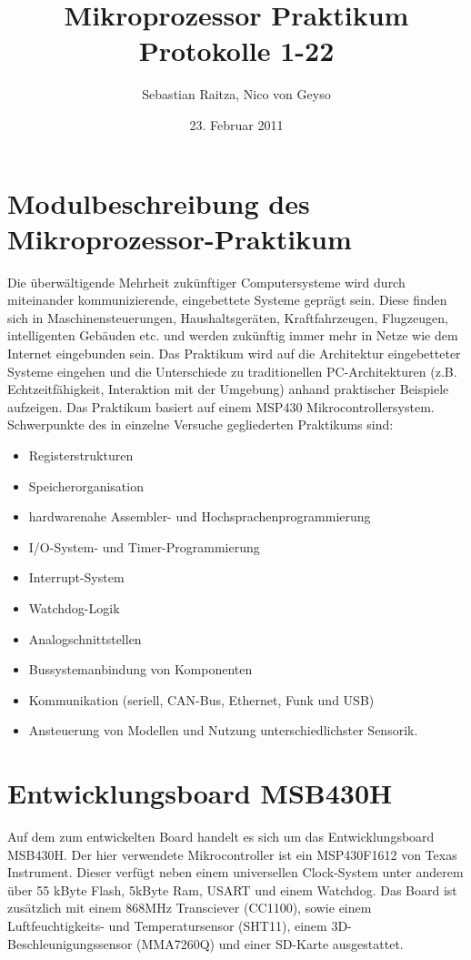 \documentclass[11pt,german]{scrartcl}
\title{Mikroprozessor Praktikum\\Protokolle 1-22}
\author{Sebastian Raitza, Nico von Geyso}
\date{23. Februar 2011}
\begin{document}
\maketitle

\tableofcontents

\section{Modulbeschreibung des Mikroprozessor-Praktikum}

Die überwältigende Mehrheit zukünftiger Computersysteme wird durch miteinander kommunizierende, eingebettete Systeme geprägt sein.
Diese finden sich in Maschinensteuerungen, Haushaltsgeräten, Kraftfahrzeugen, Flugzeugen, intelligenten Gebäuden etc. und
werden zukünftig immer mehr in Netze wie dem Internet eingebunden sein.
Das Praktikum wird auf die Architektur eingebetteter Systeme eingehen und die Unterschiede zu traditionellen PC-Architekturen
(z.B. Echtzeitfähigkeit, Interaktion mit der Umgebung) anhand praktischer Beispiele aufzeigen.
Das Praktikum basiert auf einem MSP430 Mikrocontrollersystem.
Schwerpunkte des in einzelne Versuche gegliederten Praktikums sind:
\begin{itemize}
    \item Registerstrukturen
    \item Speicherorganisation
    \item hardwarenahe Assembler- und Hochsprachenprogrammierung
    \item I/O-System- und Timer-Programmierung
    \item Interrupt-System
    \item Watchdog-Logik
    \item Analogschnittstellen
    \item Bussystemanbindung von Komponenten
    \item Kommunikation (seriell, CAN-Bus, Ethernet, Funk und USB)
    \item Ansteuerung von Modellen und Nutzung unterschiedlichster Sensorik.
\end{itemize}


\section{Entwicklungsboard MSB430H}
Auf dem zum entwickelten Board handelt es sich um das Entwicklungsboard MSB430H.
Der hier verwendete Mikrocontroller ist ein MSP430F1612 von Texas Instrument.
Dieser verfügt neben einem universellen Clock-System unter anderem über 55 kByte Flash, 5kByte Ram, USART und einem Watchdog.
Das Board ist zusätzlich mit einem 868MHz Transciever (CC1100),
sowie einem Luftfeuchtigkeits- und Temperatursensor (SHT11), einem 3D-Beschleunigungssensor (MMA7260Q)
und einer SD-Karte ausgestattet.
\end{document}
